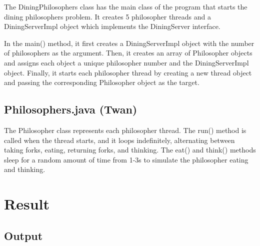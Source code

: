 \documentclass{article}
\begin{document}
The DiningPhilosophers class has the main class of the program that starts the dining philosophers problem. It creates 5 philosopher threads and a DiningServerImpl object which implements the DiningServer interface.

In the main() method, it first creates a DiningServerImpl object with the number of philosophers as the argument. Then, it creates an array of Philosopher objects and assigns each object a unique philosopher number and the DiningServerImpl object. Finally, it starts each philosopher thread by creating a new thread object and passing the corresponding Philosopher object as the target.

\subsection{Philosophers.java (Twan)}

The Philosopher class represents each philosopher thread. The run() method is called when the thread starts, and it loops indefinitely, alternating between taking forks, eating, returning forks, and thinking. The eat() and think() methods sleep for a random amount of time from 1-3s to simulate the philosopher eating and thinking.

\section{Result}
\subsection{Output}
\end{document}
